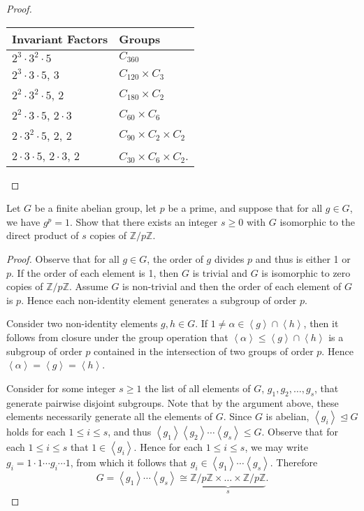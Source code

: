 \documentclass[10pt]{amsart}
\begin{document}
\begin{thm}
\begin{proof}
\begin{enumerate}[(a)]
      \begin{center}
        \begin{tabular}{l | l}
          Invariant Factors & Groups\\
          \hline
          $2^3 \cdot 3^2 \cdot 5$ & $C_{360}$\\
          $2^3 \cdot 3 \cdot 5$, 3 & $C_{120} \times C_3$\\
          $2^2 \cdot 3^2 \cdot 5$, 2 & $C_{180} \times C_2$\\
          $2^2 \cdot 3 \cdot 5$, $2 \cdot 3$ & $C_{60} \times C_6$\\
          $2 \cdot 3^2 \cdot 5$, 2, 2 & $C_{90} \times C_2 \times C_2$\\
          $2 \cdot 3 \cdot 5$, $2\cdot 3$, 2 & $C_{30} \times C_6 \times C_2$.\\
        \end{tabular}
      \end{center}
    \end{enumerate}
  \end{proof}
\end{thm}

\begin{thm}
  Let $G$ be a finite abelian group, let $p$ be a prime, and suppose that for all $g \in G$, we have $g^p = 1$.
  Show that there exists an integer $s \geq 0$ with $G$ isomorphic to the direct product of $s$ copies of $\mathbb{Z}/p\mathbb{Z}$.
  \begin{proof}
    Observe that for all $g \in G$, the order of $g$ divides $p$ and thus is either 1 or $p$.
    If the order of each element is 1, then $G$ is trivial and $G$ is isomorphic to zero copies of $\mathbb{Z}/p\mathbb{Z}$.
    Assume $G$ is non-trivial and then the order of each element of $G$ is $p$.
    Hence each non-identity element generates a subgroup of order $p$.
    
    Consider two non-identity elements $g,h \in G$.
    If $1 \not = \alpha \in \left<g\right> \cap \left<h\right>$, then it follows from closure under the group operation that $\left<\alpha\right> \leq \left<g\right> \cap \left<h\right>$ is a subgroup of order $p$ contained in the intersection of two groups of order $p$.
    Hence $\left<\alpha\right> = \left<g\right> = \left<h\right>$.
    
    Consider for some integer $s \geq 1$ the list of all elements of $G$, $g_1, g_2, \ldots, g_s$, that generate pairwise disjoint subgroups.
    Note that by the argument above, these elements necessarily generate all the elements of $G$.
    Since $G$ is abelian, $\left<g_i\right> \unlhd G$ holds for each $1 \leq i \leq s$, and thus $\left< g_1 \right>\left< g_2 \right> \cdots \left< g_s \right> \leq G$.
    Observe that for each $1 \leq i \leq s$ that $1 \in \left<g_i\right>$.
    Hence for each $1 \leq i \leq s$, we may write $g_i = 1 \cdot 1 \cdots g_i \cdots 1$, from which it follows that $g_i \in \left< g_1 \right> \cdots \left< g_s \right>$.
    Therefore $$G =  \left< g_1 \right> \cdots \left< g_s \right> \cong \underbrace{\mathbb{Z}/p\mathbb{Z} \times \ldots \times \mathbb{Z}/p\mathbb{Z}}_s.$$
  \end{proof}
\end{thm}
\end{document}
